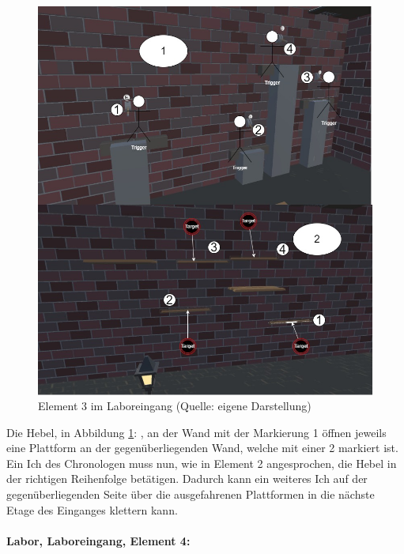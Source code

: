 \begin{figure}[ht]
\centering
\includegraphics[width=0.8\linewidth]{content/pictures/Raetsel-L02_R02_R03.jpg}
\caption{Element 3 im Laboreingang (Quelle: eigene Darstellung)}
\label{fig:L02_R02_R03}
\end{figure}

Die Hebel, in Abbildung \ref{fig:L02_R02_R03}: , an der Wand mit der Markierung 1 öffnen jeweils eine Plattform an der gegenüberliegenden Wand, welche mit einer 2 markiert ist. Ein Ich des Chronologen muss nun, wie in Element 2 angesprochen, die Hebel in der richtigen Reihenfolge betätigen. Dadurch kann ein weiteres Ich auf der gegenüberliegenden Seite über die ausgefahrenen Plattformen in die nächste Etage des Einganges klettern kann. 

\paragraph{Labor, Laboreingang, Element 4:}\label{p:lle4}

